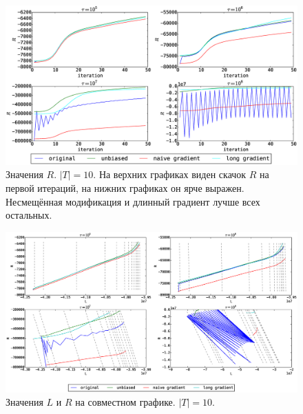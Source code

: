 \documentclass[utf8]{beamer}
\begin{document}
\begin{frame}
\begin{figure}[h]
	\centering   
	\caption{Значения $R$. $|T| = 10$.  На верхних графиках виден скачок $R$ на первой итераций, на нижних графиках он ярче выражен. Несмещённая модификация и длинный  градиент лучше всех остальных.} 
	\medskip
	\includegraphics[width=0.9\linewidth]{presentation_pictures/topics_10_R_values.eps}  
\end{figure}
\end{frame}
	

\begin{frame}
\begin{figure}[h]
	\centering  	
	\caption{Значения $L$ и $R$ на совместном графике. $|T| = 10$.} 
	\medskip
	\includegraphics[width=0.9\linewidth]{presentation_pictures/L_and_R_10.eps}  
\end{figure}
\end{frame}
	
\end{document}
